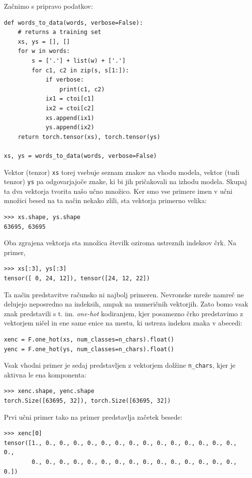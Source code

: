 Začnimo s pripravo podatkov:
%
\vspace*{3mm}
\begin{lstlisting}
def words_to_data(words, verbose=False):
    # returns a training set
    xs, ys = [], []
    for w in words:
        s = ['.'] + list(w) + ['.']
        for c1, c2 in zip(s, s[1:]):
            if verbose:
                print(c1, c2)
            ix1 = ctoi[c1]
            ix2 = ctoi[c2]
            xs.append(ix1)
            ys.append(ix2)
    return torch.tensor(xs), torch.tensor(ys)

xs, ys = words_to_data(words, verbose=False)
\end{lstlisting}
%
Vektor (tenzor) \texttt{xs} torej vsebuje seznam znakov na vhodu modela, vektor (tudi tenzor) \texttt{ys} pa odgovarjajoče znake, ki bi jih pričakovali na izhodu modela. Skupaj ta dva vektorja tvorita našo učno množico. Ker smo vse primere imen v učni množici besed na ta način nekako zlili, sta vektorja primerno velika:
%
\vspace*{3mm}
\begin{lstlisting}
>>> xs.shape, ys.shape
63695, 63695
\end{lstlisting}
%
Oba zgrajena vektorja sta množica številk oziroma ustreznih indeksov črk.
%
%
Na primer,
\vspace*{3mm}
\begin{lstlisting}
>>> xs[:3], ys[:3]
tensor([ 0, 24, 12]), tensor([24, 12, 22])
\end{lstlisting}

Ta način predstavitve računsko ni najbolj primeren. Nevronske mreže namreč ne delujejo neposredno na indeksih, ampak na numeričnih vektorjih. Zato bomo vsak znak predstavili s t. im. \textit{one-hot} kodiranjem, kjer posamezno črko predstavimo z vektorjem ničel in ene same enice na mestu, ki ustreza indeksu znaka v abecedi:
%
\vspace*{3mm}
\begin{lstlisting}
xenc = F.one_hot(xs, num_classes=n_chars).float()
yenc = F.one_hot(ys, num_classes=n_chars).float()
\end{lstlisting}
%
Vsak vhodni primer je sedaj predstavljen z vektorjem dolžine \texttt{n\_chars}, kjer je aktivna le ena komponenta:
%
\vspace*{3mm}
\begin{lstlisting}
>>> xenc.shape, yenc.shape
torch.Size([63695, 32]), torch.Size([63695, 32])
\end{lstlisting}
%
Prvi učni primer tako na primer predstavlja začetek besede:
%
\vspace*{3mm}
\begin{lstlisting}
>>> xenc[0]
tensor([1., 0., 0., 0., 0., 0., 0., 0., 0., 0., 0., 0., 0., 0., 0., 0.,
        0., 0., 0., 0., 0., 0., 0., 0., 0., 0., 0., 0., 0., 0., 0., 0.])
\end{lstlisting}

